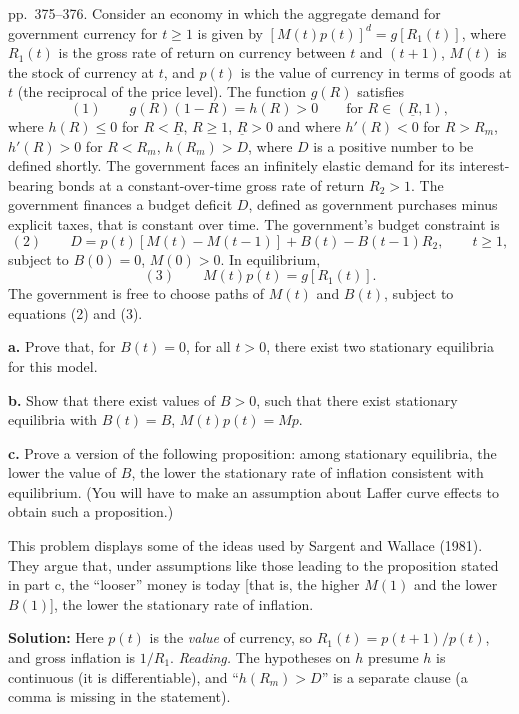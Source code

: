 \documentclass[12pt, letterpaper]{article}
\begin{document}
\begin{tcolorbox}[oddbox,title={Exercise 9.11 \quad Unpleasant monetarist arithmetic}]
\begin{tcolorbox}[questionbox]
pp.~375--376. Consider an economy in which the aggregate demand for government currency for $t\ge1$
is given by $[M(t)p(t)]^d=g[R_1(t)]$, where $R_1(t)$ is the gross rate of return on currency between
$t$ and $(t+1)$, $M(t)$ is the stock of currency at $t$, and $p(t)$ is the value of currency in terms
of goods at $t$ (the reciprocal of the price level). The function $g(R)$ satisfies
\[
(1)\qquad g(R)(1-R)=h(R)>0\qquad\text{for }R\in(\underline R,1),
\]
where $h(R)\le0$ for $R<\underline R$, $R\ge1$, $\underline R>0$ and where $h'(R)<0$ for $R>R_m$,
$h'(R)>0$ for $R<R_m$, $h(R_m)>D$, where $D$ is a positive number to be defined shortly. The
government faces an infinitely elastic demand for its interest-bearing bonds at a
constant-over-time gross rate of return $R_2>1$. The government finances a budget deficit $D$,
defined as government purchases minus explicit taxes, that is constant over time. The government's
budget constraint is
\[
(2)\qquad D=p(t)[M(t)-M(t-1)]+B(t)-B(t-1)R_2,\qquad t\ge1,
\]
subject to $B(0)=0$, $M(0)>0$. In equilibrium,
\[
(3)\qquad M(t)p(t)=g[R_1(t)].
\]
The government is free to choose paths of $M(t)$ and $B(t)$, subject to equations (2) and (3).

\textbf{a.} Prove that, for $B(t)=0$, for all $t>0$, there exist two stationary equilibria for this
model.

\textbf{b.} Show that there exist values of $B>0$, such that there exist stationary equilibria with
$B(t)=B$, $M(t)p(t)=Mp$.

\textbf{c.} Prove a version of the following proposition: among stationary equilibria, the lower the
value of $B$, the lower the stationary rate of inflation consistent with equilibrium. (You will have
to make an assumption about Laffer curve effects to obtain such a proposition.)

This problem displays some of the ideas used by Sargent and Wallace (1981). They argue that, under
assumptions like those leading to the proposition stated in part c, the ``looser'' money is today
[that is, the higher $M(1)$ and the lower $B(1)$], the lower the stationary rate of inflation.
\end{tcolorbox}

\textbf{Solution:} Here $p(t)$ is the \emph{value} of currency, so $R_1(t)=p(t+1)/p(t)$, and gross
inflation is $1/R_1$. \emph{Reading.} The hypotheses on $h$ presume $h$ is continuous (it is
differentiable), and ``$h(R_m)>D$'' is a separate clause (a comma is missing in the statement).


\end{tcolorbox}
\end{document}
